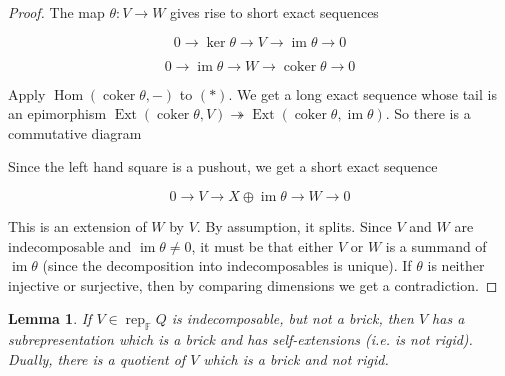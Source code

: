 \documentclass{book}
\newtheorem{lemma}[theorem]{Lemma}
\DeclareMathOperator{\Hom}{Hom}
\DeclareMathOperator{\rep}{rep}
\DeclareMathOperator{\im}{im}
\DeclareMathOperator{\coker}{coker}
\DeclareMathOperator{\Ext}{Ext}
\begin{document}
\begin{proof}
The map $\theta : V \to W$ gives rise to short exact sequences

\begin{equation}\label{eqn:eqn1}
0 \to \ker \theta \to V \to \im \theta \to 0
\end{equation}

\begin{equation}
0 \to \im \theta \to W \to \coker \theta \to 0
\end{equation}

Apply $\Hom(\coker \theta, -)$ to $(\ast)$. We get a long exact sequence whose tail is an epimorphism $\Ext(\coker \theta, V) \twoheadrightarrow \Ext(\coker \theta, \im \theta)$. So there is a commutative diagram


Since the left hand square is a pushout,  we get a short exact sequence

\begin{equation*}
0 \to V \to X \oplus \im \theta \to W \to 0
\end{equation*}

This is an extension of $W$ by $V$. By assumption, it splits. Since $V$ and $W$ are indecomposable and $\im \theta \neq 0$, it must be that either $V$ or $W$ is a summand of $\im \theta$ (since the decomposition into indecomposables is unique). If $\theta$ is neither injective or surjective, then by comparing dimensions we get a contradiction.
\end{proof}

\begin{lemma}
If $V \in \rep_\mathbb{F} Q$ is indecomposable, but not a brick, then $V$ has a subrepresentation which is a brick and has self-extensions (i.e. is not rigid). Dually, there is a quotient of $V$ which is a brick and not rigid.
\end{lemma} 
\end{document}
